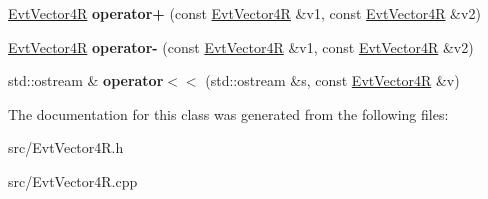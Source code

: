 \begin{DoxyCompactItemize}
\item 
\hypertarget{class_evt_vector4_r_aa0e6d593dac762344d4b8ab8581643d9}{}\hyperlink{class_evt_vector4_r}{Evt\+Vector4\+R} {\bfseries operator+} (const \hyperlink{class_evt_vector4_r}{Evt\+Vector4\+R} \&v1, const \hyperlink{class_evt_vector4_r}{Evt\+Vector4\+R} \&v2)\label{class_evt_vector4_r_aa0e6d593dac762344d4b8ab8581643d9}

\item 
\hypertarget{class_evt_vector4_r_a14cc453d71a6cc830d17425c19ead991}{}\hyperlink{class_evt_vector4_r}{Evt\+Vector4\+R} {\bfseries operator-\/} (const \hyperlink{class_evt_vector4_r}{Evt\+Vector4\+R} \&v1, const \hyperlink{class_evt_vector4_r}{Evt\+Vector4\+R} \&v2)\label{class_evt_vector4_r_a14cc453d71a6cc830d17425c19ead991}

\item 
\hypertarget{class_evt_vector4_r_aaf94a30e42e5f8460f0a0590329d2544}{}std\+::ostream \& {\bfseries operator$<$$<$} (std\+::ostream \&s, const \hyperlink{class_evt_vector4_r}{Evt\+Vector4\+R} \&v)\label{class_evt_vector4_r_aaf94a30e42e5f8460f0a0590329d2544}

\end{DoxyCompactItemize}


The documentation for this class was generated from the following files\+:\begin{DoxyCompactItemize}
\item 
src/Evt\+Vector4\+R.\+h\item 
src/Evt\+Vector4\+R.\+cpp\end{DoxyCompactItemize}
